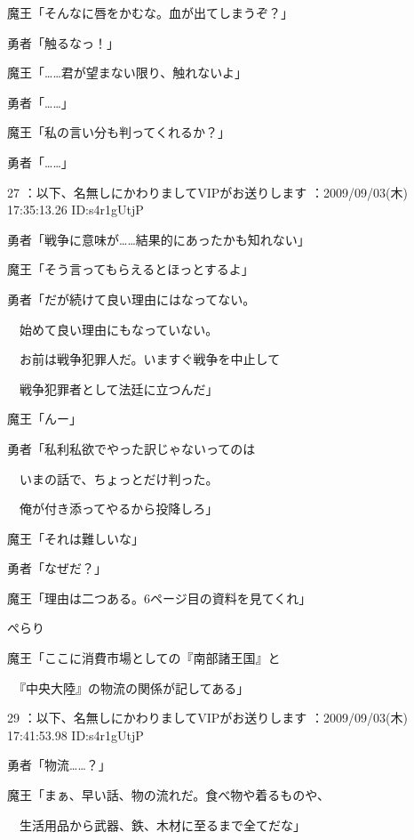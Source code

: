 \documentclass[a4j,twocolumn]{tarticle}
\begin{document}
魔王「そんなに唇をかむな。血が出てしまうぞ？」\par{} 
勇者「触るなっ！」 



魔王「……君が望まない限り、触れないよ」\par{} 
勇者「……」 



魔王「私の言い分も判ってくれるか？」\par{} 
勇者「……」 

	
    
    

27 ：以下、名無しにかわりましてVIPがお送りします ：2009/09/03(木) 17:35:13.26 ID:s4r1gUtjP 


勇者「戦争に意味が……結果的にあったかも知れない」\par{} 
魔王「そう言ってもらえるとほっとするよ」 



勇者「だが続けて良い理由にはなってない。\par{} 
　始めて良い理由にもなっていない。\par{} 
　お前は戦争犯罪人だ。いますぐ戦争を中止して \par{}
　戦争犯罪者として法廷に立つんだ」 



魔王「んー」\par{} 
勇者「私利私欲でやった訳じゃないってのは\par{} 
　いまの話で、ちょっとだけ判った。\par{} 
　俺が付き添ってやるから投降しろ」 



魔王「それは難しいな」\par{} 
勇者「なぜだ？」 



魔王「理由は二つある。6ページ目の資料を見てくれ」 



ぺらり 



魔王「ここに消費市場としての『南部諸王国』と\par{} 
　『中央大陸』の物流の関係が記してある」
 
	
    
    

29 ：以下、名無しにかわりましてVIPがお送りします ：2009/09/03(木) 17:41:53.98 ID:s4r1gUtjP 


勇者「物流……？」\par{} 
魔王「まぁ、早い話、物の流れだ。食べ物や着るものや、\par{} 
　生活用品から武器、鉄、木材に至るまで全てだな」 
\end{document}
